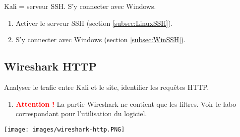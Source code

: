 \documentclass[a4paper]{article}
\begin{document}
Kali = serveur SSH. S'y connecter avec Windows.

\begin{example}
\begin{enumerate}
    \item Activer le serveur SSH (section \ref{subsec:LinuxSSH}).
    \item S'y connecter avec Windows (section \ref{subsec:WinSSH}).
\end{enumerate}
\end{example}





\subsection{Wireshark HTTP}

Analyser le trafic entre Kali et le site, identifier les requêtes HTTP.

\begin{example}
\begin{enumerate}
    \item \textcolor{red}{\textbf{Attention !}} La partie Wireshark ne contient que les filtres. Voir le labo correspondant pour l'utilisation du logiciel.
\end{enumerate}
\end{example}
\texttt{[image: images/wireshark-http.PNG]}





















\end{document}
